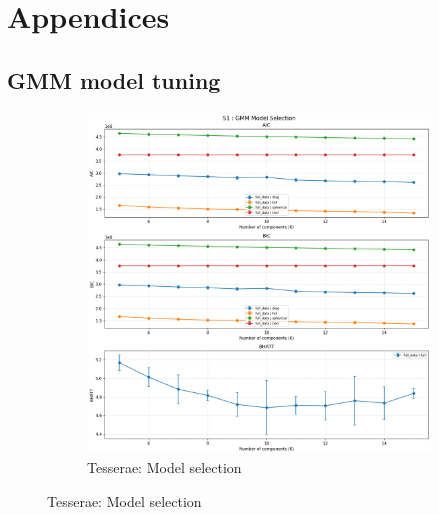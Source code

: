 \section{Appendices}
\begin{appendices}

\section{GMM model tuning}


\begin{figure}[htbp]
  \centering

  \begin{subfigure}[t]{\textwidth}
    \centering
    \includegraphics[width=\textwidth]{figures/appendix/tesserae_gmm_model_selection.png}
    \caption{Tesserae: Model selection}
    \label{fig:s1_sel}
  \end{subfigure}

  \medskip


\end{figure}
\end{appendices}
